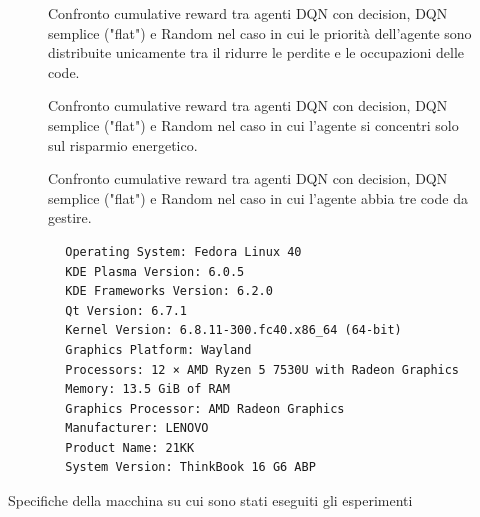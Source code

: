 \documentclass[conference]{IEEEtran}
\begin{document}
\begin{figure}
    \centering
    
    \caption{Confronto cumulative reward tra agenti DQN con decision, DQN semplice ("flat") e Random nel caso in cui le priorità dell'agente sono distribuite unicamente tra il ridurre le perdite e le occupazioni delle code.}
    \label{fig:noPowerSaving_allAgents_defaultConfig}
\end{figure}
\begin{figure}
    
\caption{Confronto cumulative reward tra agenti DQN con decision, DQN semplice ("flat") e Random nel caso in cui l'agente si concentri solo sul risparmio energetico.}
\label{fig:allPowerSaving_allAgents_defaultConfig}
\end{figure}
\begin{figure}
    
\caption{Confronto cumulative reward tra agenti DQN con decision, DQN semplice ("flat") e Random nel caso in cui l'agente abbia tre code da gestire.}
\label{fig:balanced_allAgents_5queues_300s}
\end{figure}

\begin{listing*}
    \begin{verbatim}
        Operating System: Fedora Linux 40
        KDE Plasma Version: 6.0.5
        KDE Frameworks Version: 6.2.0
        Qt Version: 6.7.1
        Kernel Version: 6.8.11-300.fc40.x86_64 (64-bit)
        Graphics Platform: Wayland
        Processors: 12 × AMD Ryzen 5 7530U with Radeon Graphics
        Memory: 13.5 GiB of RAM
        Graphics Processor: AMD Radeon Graphics
        Manufacturer: LENOVO
        Product Name: 21KK
        System Version: ThinkBook 16 G6 ABP
    \end{verbatim}
    \caption{Specifiche della macchina su cui sono stati eseguiti gli esperimenti}
    \label{listing:trials_machine_specs}
\end{listing*}
\end{document}
